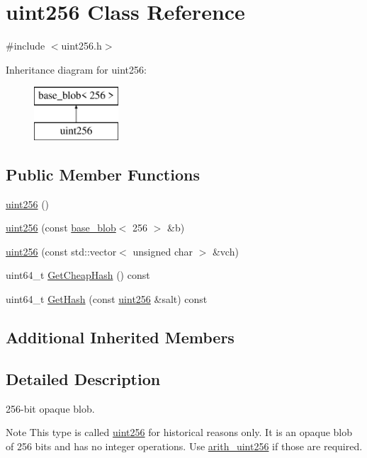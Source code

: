 \hypertarget{classuint256}{}\section{uint256 Class Reference}
\label{classuint256}


{\ttfamily \#include $<$uint256.\+h$>$}

Inheritance diagram for uint256\+:\begin{figure}[H]
\begin{center}
\leavevmode
\includegraphics[height=2.000000cm]{classuint256}
\end{center}
\end{figure}
\subsection*{Public Member Functions}
\begin{DoxyCompactItemize}
\item 
\hyperlink{classuint256_aca0c2c2c61e453717e72a4eaec71168f}{uint256} ()
\item 
\hyperlink{classuint256_a01460091171cf2b82b9e41cdb0326bed}{uint256} (const \hyperlink{classbase__blob}{base\+\_\+blob}$<$ 256 $>$ \&b)
\item 
\hyperlink{classuint256_a7cad0fc486ebc2ed02462d5a7d4e4f2d}{uint256} (const std\+::vector$<$ unsigned char $>$ \&vch)
\item 
uint64\+\_\+t \hyperlink{classuint256_a38210c00440a6c5f438f0c16cb8647fc}{Get\+Cheap\+Hash} () const 
\item 
uint64\+\_\+t \hyperlink{classuint256_a2ed8bd4e54421a37430768374a7e91b3}{Get\+Hash} (const \hyperlink{classuint256}{uint256} \&salt) const 
\end{DoxyCompactItemize}
\subsection*{Additional Inherited Members}


\subsection{Detailed Description}
256-\/bit opaque blob. \begin{DoxyNote}{Note}
This type is called \hyperlink{classuint256}{uint256} for historical reasons only. It is an opaque blob of 256 bits and has no integer operations. Use \hyperlink{classarith__uint256}{arith\+\_\+uint256} if those are required. 
\end{DoxyNote}


